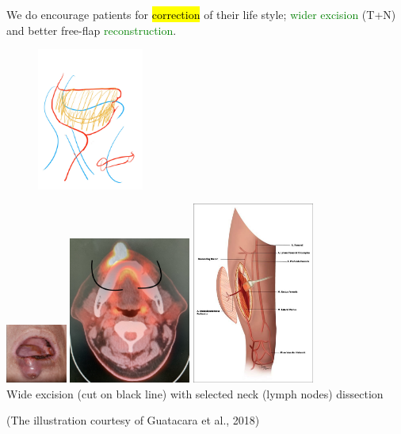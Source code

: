 \documentclass[
paper=landscape,
paper=160mm:90mm, %
fontsize=11pt, %
pagesize, %
parskip=half-, %
]{scrartcl} %
\theoremstyle{mythmstyle} %
\begin{document}
\begin{outline}
\clearpage


\1 We do
    \2 encourage patients for \hl{correction} of their life style;
    \2 \textcolor{green}{wider excision} (T+N) and better free-flap \textcolor{green}{reconstruction}.
\end{outline}
\begin{figure}
    \centering
\includegraphics[width=3.5cm]{SOHND_Artwork.jpg}
\end{figure}



\clearpage

\thispagestyle{headings}

\includegraphics[width=2cm]{IMG_7174.jpg}
\includegraphics[width=4cm]{IMG_6430.jpg} %
\includegraphics[width=4cm]{Figure-5-Vascular-anatomy-of-ALT-flap-Guatacara-et-al-2018_W640.jpg}\\
\large Wide excision (cut on black line) with selected neck (lymph nodes) dissection\\
\hspace{2cm} 
{\tiny (The illustration courtesy of Guatacara et al., 2018) \par}
\end{document}
